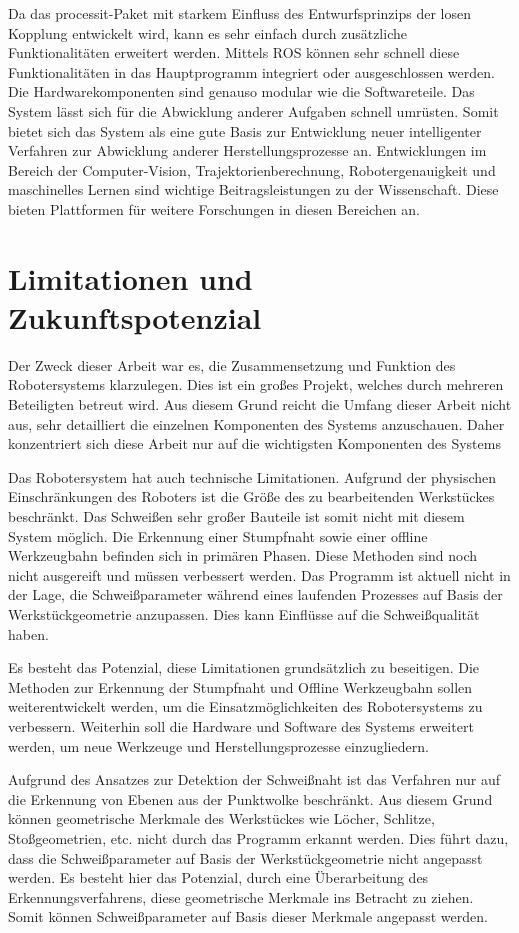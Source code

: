 Da das processit-Paket mit starkem Einfluss des Entwurfsprinzips der losen Kopplung entwickelt wird, kann es sehr einfach durch zusätzliche Funktionalitäten erweitert werden. Mittels ROS können sehr schnell diese Funktionalitäten in das Hauptprogramm integriert oder ausgeschlossen werden. Die Hardwarekomponenten sind genauso modular wie die Softwareteile. Das System lässt sich für die Abwicklung anderer Aufgaben schnell umrüsten. Somit bietet sich das System als eine gute Basis zur Entwicklung neuer intelligenter Verfahren zur Abwicklung anderer Herstellungsprozesse an. Entwicklungen im Bereich der Computer-Vision, Trajektorienberechnung, Robotergenauigkeit und maschinelles Lernen sind wichtige Beitragsleistungen zu der Wissenschaft. Diese bieten Plattformen für weitere Forschungen in diesen Bereichen an.

\section{Limitationen und Zukunftspotenzial}
Der Zweck dieser Arbeit war es, die Zusammensetzung und Funktion des Robotersystems klarzulegen. Dies ist ein großes Projekt, welches durch mehreren Beteiligten betreut wird. Aus diesem Grund reicht die Umfang dieser Arbeit nicht aus, sehr detailliert die einzelnen Komponenten des Systems anzuschauen. Daher konzentriert sich diese Arbeit nur auf die wichtigsten Komponenten des Systems

Das Robotersystem hat auch technische Limitationen. Aufgrund der physischen Einschränkungen des Roboters ist die Größe des zu bearbeitenden Werkstückes beschränkt. Das Schweißen sehr großer Bauteile ist somit nicht mit diesem System möglich. Die Erkennung einer Stumpfnaht sowie einer offline Werkzeugbahn befinden sich in primären Phasen. Diese Methoden sind noch nicht ausgereift und müssen verbessert werden. Das Programm ist aktuell nicht in der Lage, die Schweißparameter während eines laufenden Prozesses auf Basis der Werkstückgeometrie anzupassen. Dies kann Einflüsse auf die Schweißqualität haben.

Es besteht das Potenzial, diese Limitationen grundsätzlich zu beseitigen. Die Methoden zur Erkennung der Stumpfnaht und Offline Werkzeugbahn sollen weiterentwickelt werden, um die Einsatzmöglichkeiten des Robotersystems zu verbessern. Weiterhin soll die Hardware und Software des Systems erweitert werden, um neue Werkzeuge und Herstellungsprozesse einzugliedern. 

Aufgrund des Ansatzes zur Detektion der Schweißnaht ist das Verfahren nur auf die Erkennung von Ebenen aus der Punktwolke beschränkt. Aus diesem Grund können geometrische Merkmale des Werkstückes wie Löcher, Schlitze, Stoßgeometrien, etc. nicht durch das Programm erkannt werden. Dies führt dazu, dass die Schweißparameter auf Basis der Werkstückgeometrie nicht angepasst werden. Es besteht hier das Potenzial, durch eine Überarbeitung des Erkennungsverfahrens, diese geometrische Merkmale ins Betracht zu ziehen. Somit können Schweißparameter auf Basis dieser Merkmale angepasst werden.

